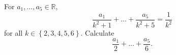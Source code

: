 For $a_1,\ldots,a_5\in\mathbb{R}$, \[\frac{a_1}{k^2+1}+\ldots+\frac{a_5}{k^2+5}=\frac{1}{k^2}\] for all $k\in\left\{2,3,4,5,6\right\}$. Calculate \[\frac{a_1}{2}+\ldots+\frac{a_5}{6}.\]